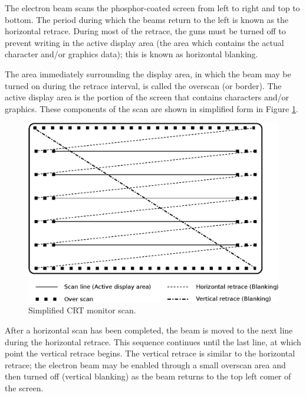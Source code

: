 \documentclass[book.tex]{subfiles}
\begin{document}
The electron beam scans the phosphor-coated screen from left to right and
top to bottom. The period during which the beams return to the left is known as
the horizontal retrace. During most of the retrace, the guns must be turned off
to prevent writing in the active display area (the area which contains the actual
character and/or graphics data); this is known as horizontal blanking.\\

\par
The area immediately surrounding the display area, in which the beam may be turned on
during the retrace interval, is called the overscan (or border). The active display
area is the portion of the screen that contains characters and/or graphics. These
components of the scan are shown in simplified form in Figure \ref{fig:monitor}.\\

\begin{figure}[H]
\centering
\includegraphics[width=\textwidth]{imgs/drawings/monitor.eps}
\caption{Simplified CRT monitor scan.}
\label{fig:monitor}
\end{figure}

\par
After a horizontal scan has been completed, the beam is moved to the next
line during the horizontal retrace. This sequence continues until the last line, at which point the vertical retrace begins. The vertical retrace is similar to the horizontal retrace; the electron beam may be enabled through a small overscan area and then turned off (vertical blanking) as the beam returns to the top left comer of the screen.\\
\end{document}
